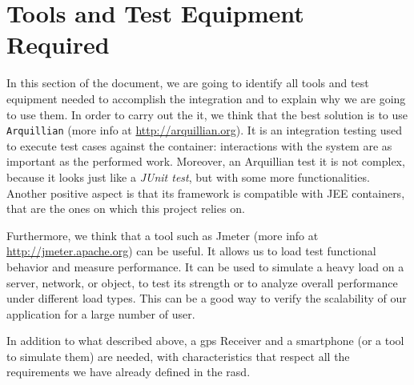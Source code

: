 \section{Tools and Test Equipment Required} \label{sec:tter}

In this section of the document, we are going to identify all tools and test equipment needed to accomplish the integration and to explain why we are going to use them.
In order to carry out the \acl{it}, we think that the best solution is to use \texttt{Arquillian} (more info at \url{http://arquillian.org}). It is an integration testing used to execute test cases against the container: interactions with the system are as important as the performed work. Moreover, an Arquillian test it is not complex, because it looks just like a \textit{JUnit test}, but with some more functionalities. Another positive aspect is that its framework is compatible with JEE containers, that are the ones on which this project relies on.
\newline

Furthermore, we think that a tool such as Jmeter (more info at \url{http://jmeter.apache.org}) can be useful. It allows us to load test functional behavior and measure performance. It can be used to simulate a heavy load on a server, network, or object, to test its strength or to analyze overall performance under different load types. This can be a good way to verify the scalability of our application for a large number of user.
\newline

In addition to what described above, a \acs{gps} Receiver and a smartphone (or a tool to simulate them) are needed, with characteristics that respect all the requirements we have already defined in the \acs{rasd}.